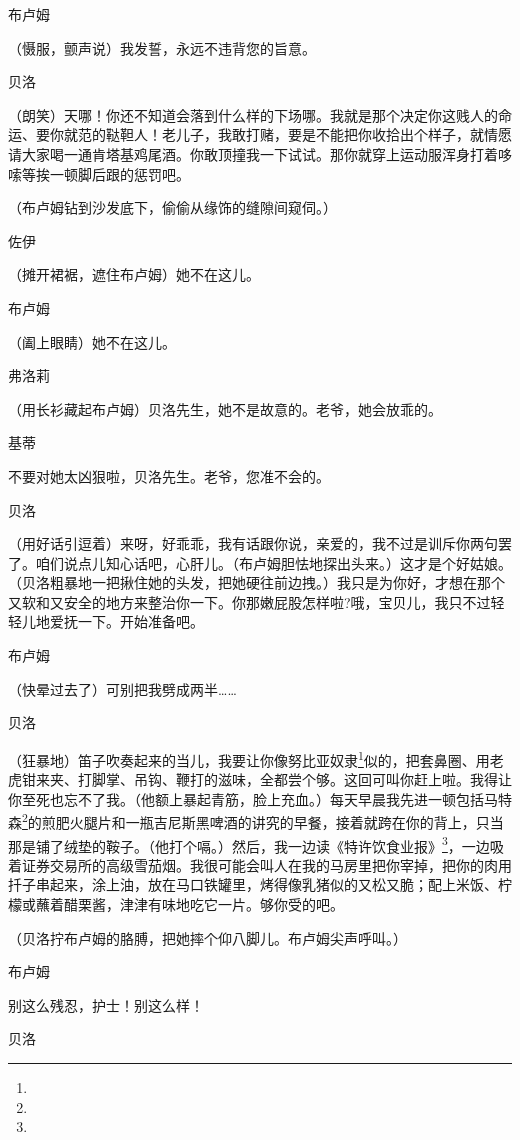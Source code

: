 \par 布卢姆
\par （慑服，颤声说）我发誓，永远不违背您的旨意。
\par 贝洛
\par （朗笑）天哪！你还不知道会落到什么样的下场哪。我就是那个决定你这贱人的命运、要你就范的鞑靼人！老儿子，我敢打赌，要是不能把你收拾出个样子，就情愿请大家喝一通肯塔基鸡尾酒。你敢顶撞我一下试试。那你就穿上运动服浑身打着哆嗦等挨一顿脚后跟的惩罚吧。
\par （布卢姆钻到沙发底下，偷偷从缘饰的缝隙间窥伺。）
\par 佐伊
\par （摊开裙裾，遮住布卢姆）她不在这儿。
\par 布卢姆
\par （阖上眼睛）她不在这儿。
\par 弗洛莉
\par （用长衫藏起布卢姆）贝洛先生，她不是故意的。老爷，她会放乖的。
\par 基蒂
\par 不要对她太凶狠啦，贝洛先生。老爷，您准不会的。
\par 贝洛
\par （用好话引逗着）来呀，好乖乖，我有话跟你说，亲爱的，我不过是训斥你两句罢了。咱们说点儿知心话吧，心肝儿。（布卢姆胆怯地探出头来。）这才是个好姑娘。（贝洛粗暴地一把揪住她的头发，把她硬往前边拽。）我只是为你好，才想在那个又软和又安全的地方来整治你一下。你那嫩屁股怎样啦?哦，宝贝儿，我只不过轻轻儿地爱抚一下。开始准备吧。
\par 布卢姆
\par （快晕过去了）可别把我劈成两半……
\par 贝洛
\par （狂暴地）笛子吹奏起来的当儿，我要让你像努比亚奴隶\footnote{}似的，把套鼻圈、用老虎钳来夹、打脚掌、吊钩、鞭打的滋味，全都尝个够。这回可叫你赶上啦。我得让你至死也忘不了我。（他额上暴起青筋，脸上充血。）每天早晨我先进一顿包括马特森\footnote{}的煎肥火腿片和一瓶吉尼斯黑啤酒的讲究的早餐，接着就跨在你的背上，只当那是铺了绒垫的鞍子。（他打个嗝。）然后，我一边读《特许饮食业报》\footnote{}，一边吸着证券交易所的高级雪茄烟。我很可能会叫人在我的马房里把你宰掉，把你的肉用扦子串起来，涂上油，放在马口铁罐里，烤得像乳猪似的又松又脆；配上米饭、柠檬或蘸着醋栗酱，津津有味地吃它一片。够你受的吧。
\par （贝洛拧布卢姆的胳膊，把她摔个仰八脚儿。布卢姆尖声呼叫。）
\par 布卢姆
\par 别这么残忍，护士！别这么样！
\par 贝洛
